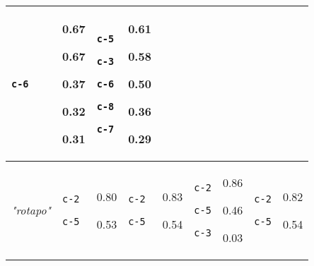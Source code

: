 {\begin{tabular}{@{}p{1.2cm}|p{1.3cm}@{}p{0.8cm}@{}|p{1.3cm}@{}p{0.8cm}@{}|p{1.3cm}@{}p{0.8cm}@{}|p{1.3cm}@{}p{0.8cm}@{}}
\texttt{c-6} & 0.67

0.67

0.37

0.32

0.31 & \texttt{c-5}

\texttt{c-3}

\texttt{c-6}

\texttt{c-8}

\texttt{c-7} & 0.61

0.58

0.50

0.36

0.29\\
\hline
\textit{"rotapo"} & \texttt{c-2}

\texttt{c-5} & 0.80

0.53 & \texttt{c-2}

\texttt{c-5} & 0.83

0.54 & \texttt{c-2}

\texttt{c-5}

\texttt{c-3} & 0.86

0.46

0.03 & \texttt{c-2}

\texttt{c-5} & 0.82

0.54
\end{tabular}}
